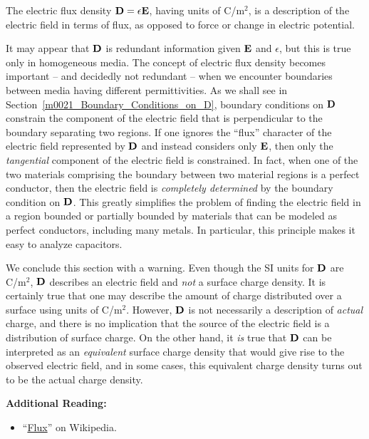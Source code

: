 \begin{mdframed}[backgroundcolor=yellow!20,nobreak=true] 
The electric flux density 
${\bf D} = \epsilon {\bf E}$, having units of C/m$^2$, is a description of the electric field in terms of flux, as opposed to force or change in electric potential. 
\end{mdframed}

It may appear that ${\bf D}$ is redundant information given ${\bf E}$ and $\epsilon$, but this is true only in homogeneous media.
The concept of electric flux density becomes important -- and decidedly not redundant -- when we encounter boundaries between media having different permittivities.  
As we shall see in Section~\ref{m0021_Boundary_Conditions_on_D}, boundary conditions on ${\bf D}$ constrain the component of the electric field that is perpendicular to the boundary separating two regions.  If one ignores the ``flux'' character of the electric field represented by ${\bf D}$ and instead considers only ${\bf E}$, then only the \emph{tangential} component of the electric field is constrained.  
In fact, when one of the two materials comprising the boundary between two material regions is a perfect conductor, 
then the electric field is \emph{completely determined} by the boundary condition on ${\bf D}$.  This greatly simplifies the problem of finding the electric field in a region bounded or partially bounded by materials that can be modeled as perfect conductors, including many metals.  In particular, this principle makes it easy to analyze capacitors. 
 
We conclude this section with a warning.
Even though the SI units for ${\bf D}$ are C/m$^2$, ${\bf D}$ describes an electric field and \emph{not} a surface charge density.
It is certainly true that one may describe the amount of charge distributed over a surface using units of C/m$^2$.
However, ${\bf D}$ is not necessarily a description of \emph{actual} charge, and there is no implication that the source of the electric field is a distribution of surface charge.
On the other hand, it \emph{is} true that ${\bf D}$ can be interpreted as an \emph{equivalent} surface charge density that would give rise to the observed electric field, and in some cases, this equivalent charge density turns out to be the actual charge density. 


{\bf Additional Reading:}
\begin{itemize}
\item ``\href{https://en.wikipedia.org/wiki/Flux}{Flux}'' on Wikipedia.
\end{itemize}

